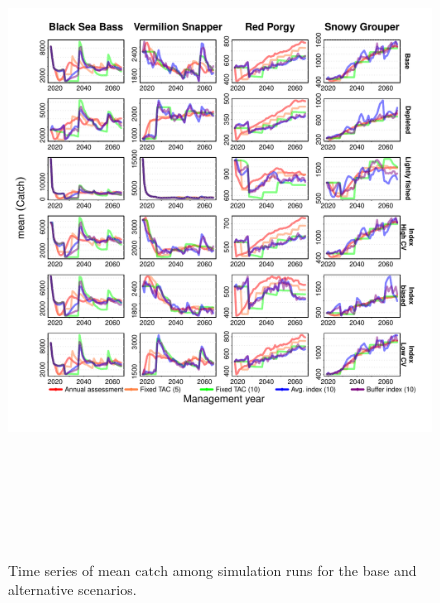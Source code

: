 \documentclass[12pt,english]{article}
\begin{document}
\begin{figure}[!ht]
\begin{center}
\includegraphics[width=6in,height=7in]{../Figs/tsCatch1.pdf}
\end{center}
\begin{flushleft}
\caption{Time series of mean $\mathrm{catch}$ among simulation runs for the base and alternative scenarios. }
\label{fig:tsCatch1}
\end{flushleft}
\end{figure}
\end{document}
